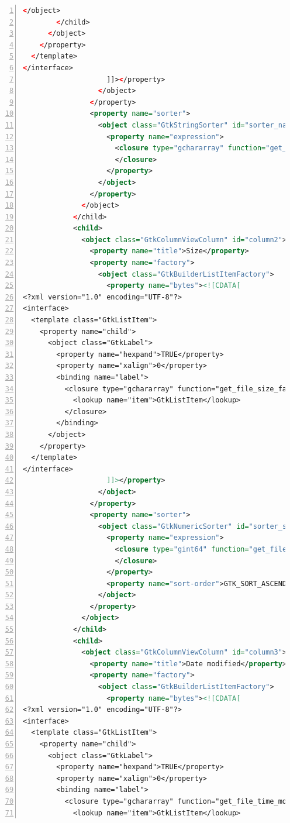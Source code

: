 \begin{lstlisting}[language=XML, numbers=left]
          </object>
        </child>
      </object>
    </property>
  </template>
</interface>
                    ]]></property>
                  </object>
                </property>
                <property name="sorter">
                  <object class="GtkStringSorter" id="sorter_name">
                    <property name="expression">
                      <closure type="gchararray" function="get_file_name">
                      </closure>
                    </property>
                  </object>
                </property>
              </object>
            </child>
            <child>
              <object class="GtkColumnViewColumn" id="column2">
                <property name="title">Size</property>
                <property name="factory">
                  <object class="GtkBuilderListItemFactory">
                    <property name="bytes"><![CDATA[
<?xml version="1.0" encoding="UTF-8"?>
<interface>
  <template class="GtkListItem">
    <property name="child">
      <object class="GtkLabel">
        <property name="hexpand">TRUE</property>
        <property name="xalign">0</property>
        <binding name="label">
          <closure type="gchararray" function="get_file_size_factory">
            <lookup name="item">GtkListItem</lookup>
          </closure>
        </binding>
      </object>
    </property>
  </template>
</interface>
                    ]]></property>
                  </object>
                </property>
                <property name="sorter">
                  <object class="GtkNumericSorter" id="sorter_size">
                    <property name="expression">
                      <closure type="gint64" function="get_file_size">
                      </closure>
                    </property>
                    <property name="sort-order">GTK_SORT_ASCENDING</property>
                  </object>
                </property>
              </object>
            </child>
            <child>
              <object class="GtkColumnViewColumn" id="column3">
                <property name="title">Date modified</property>
                <property name="factory">
                  <object class="GtkBuilderListItemFactory">
                    <property name="bytes"><![CDATA[
<?xml version="1.0" encoding="UTF-8"?>
<interface>
  <template class="GtkListItem">
    <property name="child">
      <object class="GtkLabel">
        <property name="hexpand">TRUE</property>
        <property name="xalign">0</property>
        <binding name="label">
          <closure type="gchararray" function="get_file_time_modified_factory">
            <lookup name="item">GtkListItem</lookup>

\end{lstlisting}
